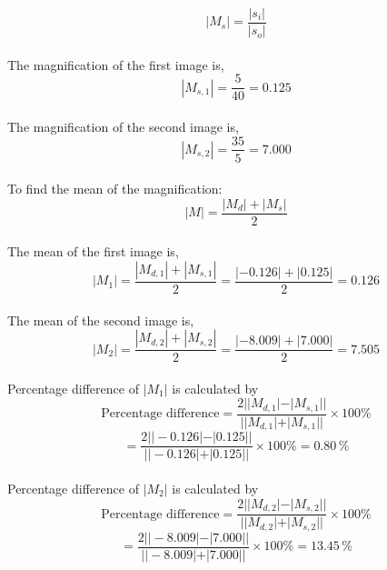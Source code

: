 \documentclass[a4paper,11pt]{article}
\begin{document}
\[ |M_s| = \frac{|s_i|}{|s_o|} \]
~\\
The magnification of the first image is,
\[ |M_{s,1}| = \frac{5}{40} = 0.125 \]
~\\
The magnification of the second image is,
\[ |M_{s,2}| = \frac{35}{5} = 7.000 \]
~\\
To find the mean of the magnification:
\[ |M| = \frac{|M_d| + |M_s|}{2} \]
~\\
The mean of the first image is,
\[ |M_1| = \frac{|M_{d,1}| + |M_{s,1}|}{2} = \frac{|-0.126| + |0.125|}{2} = 0.126 \]
~\\
The mean of the second image is,
\[ |M_2| = \frac{|M_{d,2}| + |M_{s,2}|}{2} = \frac{|-8.009| + |7.000|}{2} = 7.505 \]
~\\
Percentage difference of \( |M_1| \) is calculated by
\[ \text{Percentage difference} = \frac{2||M_{d,1}|-|M_{s,1}||}{||M_{d,1}|+|M_{s,1}||} \times 100\% \]
\[ = \frac{2||-0.126| -| 0.125||}{||-0.126|+|0.125||} \times 100\% = 0.80\,\% \]
~\\
Percentage difference of \( |M_2| \) is calculated by
\[ \text{Percentage difference} = \frac{2||M_{d,2}|-|M_{s,2}||}{||M_{d,2}|+|M_{s,2}||} \times 100\% \]
\[ = \frac{2||-8.009| - |7.000||}{||-8.009|+|7.000||} \times 100\% = 13.45\,\% \]
\newpage
\end{document}
